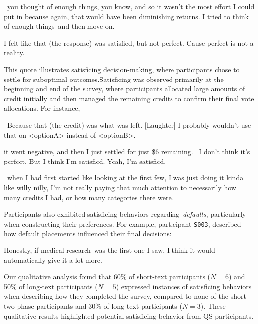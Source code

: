 \begin{displayquote}
    ~\bracketellipsis you thought of enough things, you know, and so it wasn't the most effort I could put in because again, that would have been diminishing returns. I tried to think of enough things~\bracketellipsis and then move on.~\bracketellipsis
    \hfill{}
\end{displayquote}

\begin{displayquote}
    I felt like that (the response) was satisfied, but not perfect. Cause perfect is not a reality. \hfill{}
\end{displayquote}

This quote illustrates satisficing decision-making, where participants chose to settle for suboptimal outcomes.Satisficing was observed primarily at the beginning and end of the survey, where participants allocated large amounts of credit initially and then managed the remaining credits to confirm their final vote allocations. For instance, 

\begin{displayquote}
    ~\bracketellipsis Because that (the credit) was what was left. [Laughter] I probably wouldn't use that on <optionA> instead of <optionB>.~\bracketellipsis \hfill{}
\end{displayquote}
\begin{displayquote}
    \bracketellipsis it went negative, and then I just settled for just \$6 remaining. ~\bracketellipsis I don't think it's perfect. But I think I'm satisfied. Yeah, I'm satisfied.  \hfill{}
\end{displayquote}
\begin{displayquote}
    ~\bracketellipsis when I had first started like looking at the first few, I was just doing it kinda like willy nilly, I'm not really paying that much attention to necessarily how many credits I had, or how many categories there were. \hfill{}
\end{displayquote}

Participants also exhibited satisficing behaviors regarding~\textit{defaults}, particularly when constructing their preferences. For example, participant \texttt{S003}, described how default placements influenced their final decisions:

\begin{displayquote}
    Honestly, if medical research~\bracketellipsis was the first one I saw, I think it would automatically give it a lot more. \hfill{}
\end{displayquote}

Our qualitative analysis found that 60\% of short-text participants ($N=6$) and 50\% of long-text participants ($N=5$) expressed instances of satisficing behaviors when describing how they completed the survey, compared to none of the short two-phase participants and 30\% of long-text participants ($N=3$). These qualitative results highlighted potential satisficing behavior from QS participants.